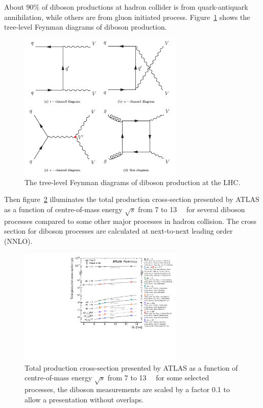 About $90\%$ of diboson productions at hadron collider is from quark-antiquark annihilation,
while others are from gluon initiated process.
Figure~\ref{fig:diboson_fd1} shows the tree-level Feynman diagrams of diboson production.
\begin{figure}[!htb]
  \centering
  \includegraphics[width=0.7\textwidth]{figures/Theory/diboson_prod_fey.png}
  \caption{The tree-level Feynman diagrams of diboson production at the LHC.}
  \label{fig:diboson_fd1}
\end{figure}
Then figure~\ref{fig:diboson_xs1} illuminates the total production cross-section presented by ATLAS
as a function of centre-of-mass energy $\sqrt{s}$ from 7 to 13~\tev~ for several diboson processes compared 
to some other major processes in hadron collision.
The cross section for diboson processes are calculated at next-to-next leading order (NNLO). 
\begin{figure}[!htb]
  \centering
  \includegraphics[width=0.7\textwidth]{figures/Theory/ATLAS_n_SMSummary_SqrtS.pdf}
  \caption{Total production cross-section presented by ATLAS as a function of centre-of-mass energy $\sqrt{s}$ from 7 to 13~\tev~ for some selected processes,
	   the diboson measurements are scaled by a factor 0.1 to allow a presentation without overlaps.}
  \label{fig:diboson_xs1}
\end{figure}

